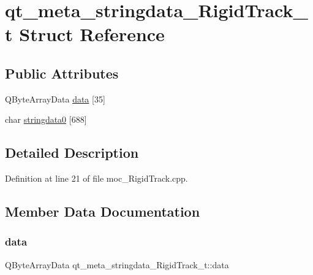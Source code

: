 \hypertarget{structqt__meta__stringdata___rigid_track__t}{}\section{qt\+\_\+meta\+\_\+stringdata\+\_\+\+Rigid\+Track\+\_\+t Struct Reference}
\label{structqt__meta__stringdata___rigid_track__t}
\subsection*{Public Attributes}
\begin{DoxyCompactItemize}
\item 
Q\+Byte\+Array\+Data \hyperlink{structqt__meta__stringdata___rigid_track__t_af58abb2f47b4fbdcae3a4a663649ad07}{data} \mbox{[}35\mbox{]}
\item 
char \hyperlink{structqt__meta__stringdata___rigid_track__t_adbbd4919c3447a71740e7dbb4e92814e}{stringdata0} \mbox{[}688\mbox{]}
\end{DoxyCompactItemize}


\subsection{Detailed Description}


Definition at line 21 of file moc\+\_\+\+Rigid\+Track.\+cpp.



\subsection{Member Data Documentation}
\mbox{\label{structqt__meta__stringdata___rigid_track__t_af58abb2f47b4fbdcae3a4a663649ad07}} 
\subsubsection{\texorpdfstring{data}{data}}
{\footnotesize\ttfamily Q\+Byte\+Array\+Data qt\+\_\+meta\+\_\+stringdata\+\_\+\+Rigid\+Track\+\_\+t\+::data}



